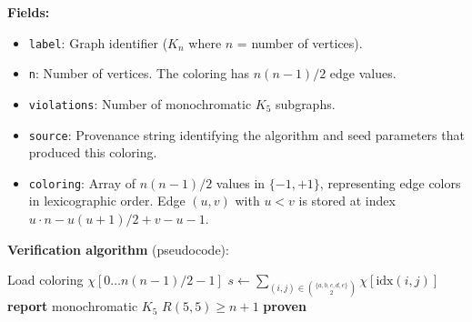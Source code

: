 \documentclass[11pt,a4paper]{article}
\theoremstyle{plain}
\theoremstyle{remark}
\begin{document}
\noindent\textbf{Fields:}
\begin{itemize}[leftmargin=2em]
  \item \texttt{label}: Graph identifier ($K_n$ where $n$ = number of vertices).
  \item \texttt{n}: Number of vertices. The coloring has
    $n(n-1)/2$ edge values.
  \item \texttt{violations}: Number of monochromatic $K_5$ subgraphs.
  \item \texttt{source}: Provenance string identifying the algorithm
    and seed parameters that produced this coloring.
  \item \texttt{coloring}: Array of $n(n-1)/2$ values in $\{-1, +1\}$,
    representing edge colors in lexicographic order.
    Edge $(u,v)$ with $u < v$ is stored at index
    $u \cdot n - u(u+1)/2 + v - u - 1$.
\end{itemize}

\noindent\textbf{Verification algorithm} (pseudocode):
\begin{algorithmic}[1]
\State Load coloring $\chi[0 \ldots n(n{-}1)/2{-}1]$
  \State $s \gets \sum_{(i,j) \in \binom{\{a,b,c,d,e\}}{2}} \chi[\text{idx}(i,j)]$
   \textbf{report} monochromatic $K_5$
  \EndIf
\EndFor
{} $R(5,5) \geq n+1$ \textbf{proven}
\EndIf
\end{algorithmic}

\end{document}
